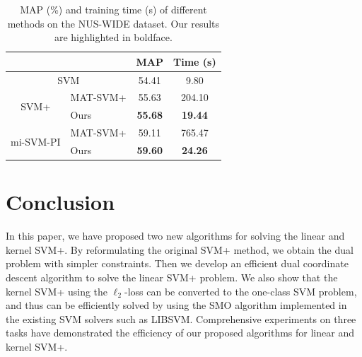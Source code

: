 \begin{table}[t]
\caption{ MAP (\%) and training time (s) of different methods on the NUS-WIDE dataset. Our results are highlighted in boldface.}
\label{tab:nuswide}
\centering
\begin{tabular}{|c|l||c|c|}
\hline
\multicolumn{2}{|c||}{}& MAP & Time (s)\\
\hline
\multicolumn{2}{|c||}{SVM} & 54.41& 9.80\\
\hline
\multirow{2}{*}{SVM+} & MAT-SVM+ & 55.63 & 204.10\\
& Ours & \textbf{55.68} & \textbf{19.44} \\
\hline
\multirow{2}{*}{mi-SVM-PI} & MAT-SVM+ & 59.11 & 765.47\\
& Ours & \textbf{59.60}& \textbf{24.26} \\
\hline
\end{tabular}
\end{table}

\section{Conclusion}
In this paper, we have proposed two new algorithms for solving the
linear and kernel SVM+. By reformulating the original SVM+ method, we
obtain the dual problem with simpler constraints. Then we develop an
efficient dual coordinate descent algorithm to solve the linear SVM+
problem. We also show that the kernel SVM+ using the $\ell_2$-loss can
be converted to the one-class SVM problem, and thus can be efficiently
solved by using the SMO algorithm implemented in the existing SVM
solvers such as LIBSVM.  Comprehensive experiments on three tasks have
demonstrated the efficiency of our proposed algorithms for linear and
kernel SVM+.

%
%
%
%
%
